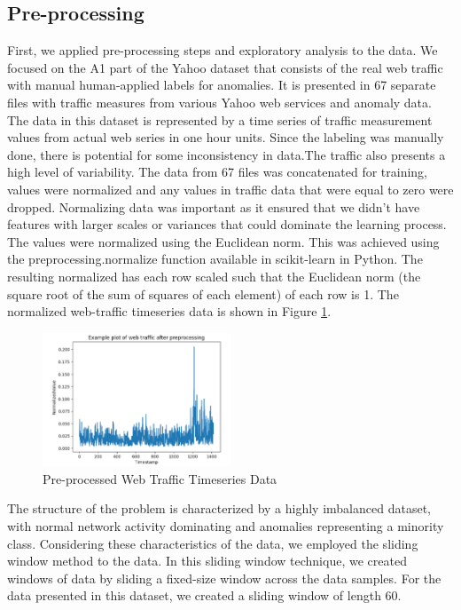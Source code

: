 \documentclass[10pt,twocolumn,letterpaper]{article}
\begin{document}
\subsection{Pre-processing}
First, we applied pre-processing steps and exploratory analysis to the data. We focused on the A1 part of the Yahoo dataset that consists of the real web 
traffic with manual human-applied labels for anomalies. It is presented in 67 separate files with traffic measures from various Yahoo web services and anomaly 
data. The data in this dataset is represented by a time series of traffic measurement values from actual web series in one hour units. 
Since the labeling was manually done, there is potential for some inconsistency in data.The traffic also presents a high level of variability.  
The data from 67 files was concatenated for training, values were normalized and any values in traffic data that were equal to zero were dropped. 
Normalizing data was important as it ensured that we didn’t have features with larger scales or variances that could dominate the learning process. 
The values were normalized using the Euclidean norm. This was achieved using the preprocessing.normalize function available in scikit-learn in Python. The resulting normalized has each row scaled such that the Euclidean norm (the square root of the sum of squares of each element) of each row is 1. 
The normalized web-traffic timeseries data is shown in Figure \ref*{pre-process-web-traffic}. 

\begin{figure}[ht]
   \centering
   \includegraphics[width=0.5\textwidth]{images/webtraffic.png}
   \caption{Pre-processed Web Traffic Timeseries Data}
   \label{pre-process-web-traffic}
   \end{figure}

The structure of the problem is characterized by a highly imbalanced dataset, with normal network activity dominating and anomalies representing a minority class.  Considering these characteristics of the data, we employed the sliding window method to the data.
In this sliding window technique, we created  windows of data by sliding a fixed-size window across the data samples. For the data presented in this dataset, we created a sliding window of length 60. 
\end{document}
